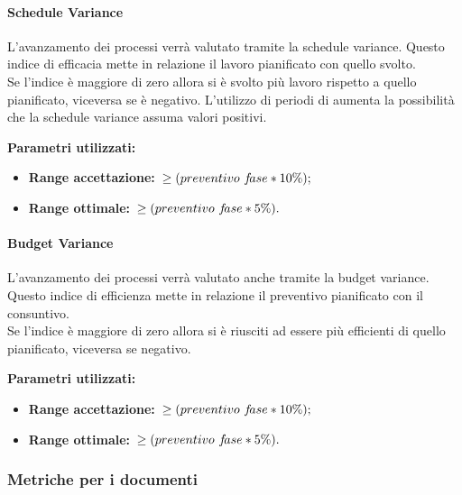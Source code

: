 			\paragraph{Schedule Variance}
				L'avanzamento dei processi verrà valutato tramite la schedule variance. Questo indice di efficacia mette in relazione il lavoro pianificato con quello svolto. \\
				Se l'indice è maggiore di zero allora si è svolto più lavoro rispetto a quello pianificato, viceversa se è negativo. L'utilizzo di periodi di  aumenta la possibilità che la schedule variance assuma valori positivi.
				
				\textbf{Parametri utilizzati:}
				\begin{itemize}
					\item \textbf{Range accettazione:}\ $\ge\-(preventivo\,\, f\!ase*10\%);$
					\item \textbf{Range ottimale:}\ $\ge\-(preventivo\,\, f\!ase*5\%).$
				\end{itemize}
				\label{sec:3.7.1.2}
			\paragraph{Budget Variance}
				\label{sec:3.7.1.3}
				L'avanzamento dei processi verrà valutato anche tramite la budget variance. Questo indice di efficienza mette in relazione il preventivo pianificato con il consuntivo. \\
				Se l'indice è maggiore di zero allora si è riusciti ad essere più efficienti di quello pianificato, viceversa se negativo.
				
				\textbf{Parametri utilizzati:}
				\begin{itemize}
					\item \textbf{Range accettazione:}\ $\ge\-(preventivo\,\, f\!ase*10\%);$
					\item \textbf{Range ottimale:}\ $\ge\-(preventivo\,\, f\!ase*5\%).$
				\end{itemize}
		\subsubsection{Metriche per i documenti}
			\label{sec:3.7.2}

